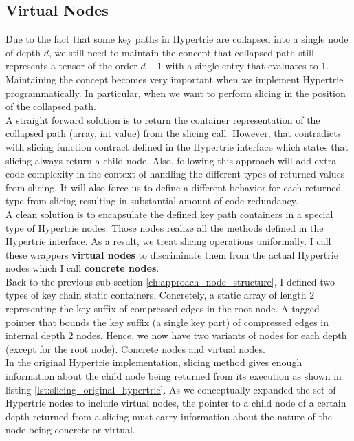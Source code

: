 \subsection{Virtual Nodes}
Due to the fact that some key paths in Hypertrie are collapsed into a single node of depth $d$, we still need to maintain the concept that collapsed path still represents a tensor of the order $d-1$ with a single entry that evaluates to 1. Maintaining the concept becomes very important when we implement Hypertrie programmatically. In particular, when we want to perform slicing in the position of the collapsed path. \\

A straight forward solution is to return the container representation of the collapsed path (array, int value) from the slicing call. However, that contradicts with slicing function contract defined in the Hypertrie interface which states that slicing always return a child node. Also, following this approach will add extra code complexity in the context of handling the different types of returned values from slicing. It will also force us to define a different behavior for each returned type from slicing resulting in substantial amount of code redundancy.  \\

A clean solution is to encapsulate the defined key path containers in a special type of Hypertrie nodes. 
Those nodes realize all the methods defined in the Hypertrie interface. 
As a result, we treat slicing operations uniformally. 
I call these wrappers \textbf{virtual nodes} to discriminate them from the actual Hypertrie nodes which I call \textbf{concrete nodes}. \\

Back to the previous sub section \ref{ch:approach_node_structure}, I defined two types of key chain static containers. 
Concretely, a static array of length 2 representing the key suffix of compressed edges in the root node. 
A tagged pointer that bounds the key suffix (a single key part) of compressed edges in internal depth 2 nodes. 
Hence, we now have two variants of nodes for each depth (except for the root node). Concrete nodes and virtual nodes. \\

In the original Hypertrie implementation, slicing method gives enough information about the child node being returned from its execution as shown in listing \ref{lst:slicing_original_hypertrie}. 
As we conceptually expanded the set of Hypertrie nodes to include virtual nodes, the pointer to a child node of a certain depth returned from a slicing must carry information about the nature of the node being concrete or virtual.

